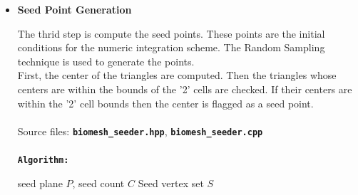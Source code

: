 \documentclass[11pt,a4paper]{article}
\begin{document}
\begin{itemize}
    The second step is identify the beginning of the fibers. The \texttt{Seed Plane} splits the vector field in two parts. Naturally, the \texttt{Seed Plane} intersects the structured grid cells. The plane-cell intersection is a surface triangulation.\\
    The seed points will be computed on this surface.\\
    
    \\
    Source files: \texttt{\textbf{biomesh\_seed\_plane.hpp}}, \texttt{\textbf{biomesh\_seed\_plane.cpp}}\\
    \\
    \texttt{\textbf{Algorithm:}}
\begin{algorithmic}[1]
    \Require Structured grid $G$, cell classification C
    \Ensure Triangle set $T$ containing valid intersections

    \State $T \gets \emptyset$ 
    \State Construct plane $P$
    \State $S \gets P \cap G$ 

        \State $c \gets \text{centroid}(t)$
        \State $cell \gets \text{cell containing } c$
            \State \text Skip $t$ 
        \EndIf
            \State $T \gets T \cup \{t\}$ 
        \EndIf
    \EndFor
\end{algorithmic}\\
\vspace{5em}
\item \textbf{Seed Point Generation}

    The thrid step is compute the seed points. These points are the initial conditions for the numeric integration scheme. The Random Sampling technique is used to generate the points.\\
    First, the center of the triangles are computed. Then the triangles whose centers are within the bounds of the '2' cells are checked. If their centers are within the '2' cell bounds then the center is flagged as a seed point.\\
    \\
    Source files: \texttt{\textbf{biomesh\_seeder.hpp}}, \texttt{\textbf{biomesh\_seeder.cpp}}\\
    \\
    \texttt{\textbf{Algorithm:}}
\begin{algorithmic}[1]
    \Require seed plane $P$, seed count $C$
    \Ensure Seed vertex set $S$


\end{algorithmic}
\end{itemize}
\end{document}
